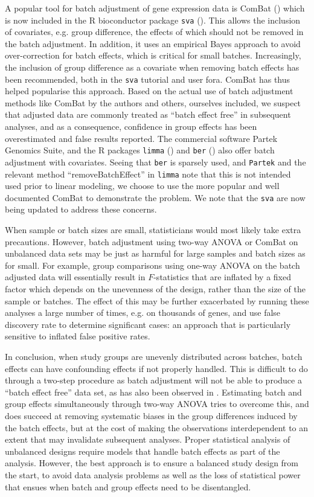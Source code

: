 \documentclass{bio}
\begin{document}
A popular tool for batch adjustment of gene expression data is ComBat (\citealp{Johnson2007}) which is now included in the R bioconductor package \texttt{sva} (\citealp{Leek2012}). This allows the inclusion of covariates, e.g. group difference, the effects of which should not be removed in the batch adjustment. In addition, it uses an empirical Bayes approach to avoid over-correction for batch effects, which is critical for small batches. Increasingly, the inclusion of group difference as a covariate when removing batch effects has been recommended, both in the \texttt{sva} tutorial and user fora. ComBat has thus helped popularise this approach. Based on the actual use of batch adjustment methods like ComBat by the authors and others, ourselves included, we suspect that adjusted data are commonly treated as ``batch effect free'' in subsequent analyses, and as a consequence, confidence in group effects has been overestimated and false results reported. The commercial software Partek Genomics Suite, and the R packages \texttt{limma} (\citealp{Smyth2003}) and \texttt{ber} (\citealp{Giordan2013}) also offer batch adjustment with covariates. Seeing that \texttt{ber} is sparsely used, and \texttt{Partek} and the relevant method ``removeBatchEffect'' in \texttt{limma} note that this is not intended used prior to linear modeling, we choose to use the more popular and well documented ComBat to demonstrate the problem. We note that the \texttt{sva} are now being updated to address these concerns.

When sample or batch sizes are small, statisticians would most likely take extra precautions. However, batch adjustment using two-way ANOVA or ComBat on unbalanced data sets may be just as harmful for large samples and batch sizes as for small. For example, group comparisons using one-way ANOVA on the batch adjusted data will essentially result in $F$-statistics that are inflated by a fixed factor which depends on the unevenness of the design, rather than the size of the sample or batches. The effect of this may be further exacerbated by running these analyses a large number of times, e.g. on thousands of genes, and use false discovery rate to determine significant cases: an approach that is particularly sensitive to inflated false positive rates.

In conclusion, when study groups are unevenly distributed across batches, batch effects can have confounding effects if not properly handled. This is difficult to do through a two-step procedure as batch adjustment will not be able to produce a ``batch effect free'' data set, as has also been observed in \citet{Buhule2014}. Estimating batch and group effects simultaneously through two-way ANOVA tries to overcome this, and does succeed at removing systematic biases in the group differences induced by the batch effects, but at the cost of making the observations interdependent to an extent that may invalidate subsequent analyses. Proper statistical analysis of unbalanced designs require models that handle batch effects as part of the analysis. However, the best approach is to ensure a balanced study design from the start, to avoid data analysis problems as well as the loss of statistical power that ensues when batch and group effects need to be disentangled.
\end{document}
